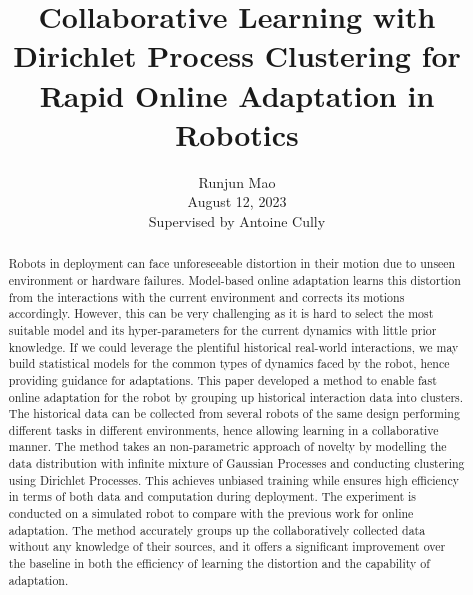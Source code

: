 \documentclass[journal]{IEEEtran}
\title{Collaborative Learning with Dirichlet Process Clustering for Rapid Online Adaptation in Robotics}
\author{Runjun Mao \\ August 12, 2023 \\ Supervised by Antoine Cully}
\begin{document}
\maketitle

\begin{abstract}
\noindent
Robots in deployment can face unforeseeable distortion in their motion due to unseen environment or hardware failures. 
Model-based online adaptation learns this distortion from the interactions with the current environment and corrects its motions accordingly. However, this can be very challenging as it is hard to select the most suitable model and its hyper-parameters for the current dynamics with little prior knowledge.
If we could leverage the plentiful historical real-world interactions, we may build statistical models for the common types of dynamics faced by the robot, hence providing guidance for adaptations. 
This paper developed a method to enable fast online adaptation for the robot by grouping up historical  interaction data into clusters. 
The historical data can be collected from several robots of the same design performing different tasks in different environments, hence allowing learning in a collaborative manner. 
The method takes an non-parametric approach of novelty by modelling the data distribution with infinite mixture of Gaussian Processes and conducting clustering using Dirichlet Processes. 
This achieves unbiased training while ensures high efficiency in terms of both data and computation during deployment. 
The experiment is conducted on a simulated robot to compare with the previous work for online adaptation. 
The method accurately groups up the collaboratively collected data without any knowledge of their sources, and it offers a significant improvement over the baseline in both the efficiency of learning the distortion and the capability of adaptation. 

\end{abstract}


\end{document}
